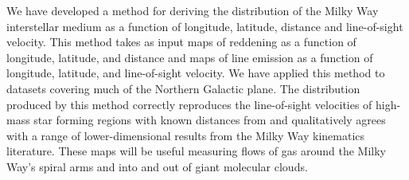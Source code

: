 
We have developed a method for deriving the distribution of the Milky Way interstellar medium as a function of longitude, latitude, distance and line-of-sight velocity.
This method takes as input maps of reddening as a function of longitude, latitude, and distance and maps of line emission as a function of longitude, latitude, and line-of-sight velocity.
We have applied this method to datasets covering much of the Northern Galactic plane.
The distribution produced by this method correctly reproduces the line-of-sight velocities of high-mass star forming regions with known distances from \citet{Reid:2014km} and qualitatively agrees with a range of lower-dimensional results from the Milky Way kinematics literature. 
These maps will be useful measuring flows of gas around the Milky Way's spiral arms and into and out of giant molecular clouds.
